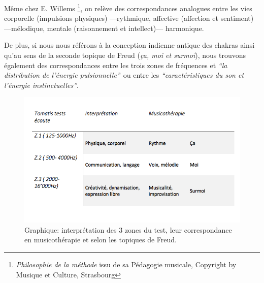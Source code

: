 Même chez E. Willems \autocite{willems} \footnote{\textit{Philosophie de la méthode} issu de sa
Pédagogie musicale, Copyright by Musique et Culture, Strasbourg}, on relève des correspondances analogues entre les vies
corporelle (impulsions physiques)
---rythmique, affective (affection et sentiment) ---mélodique, mentale
(raisonnement et intellect)--- harmonique.


De plus, si nous nous référons à la conception indienne antique des chakras
ainsi qu'au sens de la seconde
topique de Freud (\textit{ça, moi et surmoi}), nous trouvons également des correspondances
entre les trois zones de
fréquences et \textit{``la distribution de l'énergie pulsionnelle'}' ou entre
les
\textit{``caractéristiques du son et l'énergie
instinctuelles''}\autocite[ch. 13]{auriol_cle_1996}.

\begin{figure}
	\centering
	\includegraphics[width=0.7\linewidth]{images/testinterpmusico}
	\caption[ L'interprétation des 3 zones et leur correspondance
        en musicothérapie]{Graphique: interprétation des 3 zones du
          test, leur correspondance en musicothérapie et selon les
          topiques de Freud.}

	\label{graphiquecolonnetestmusico}
      \end{figure}






